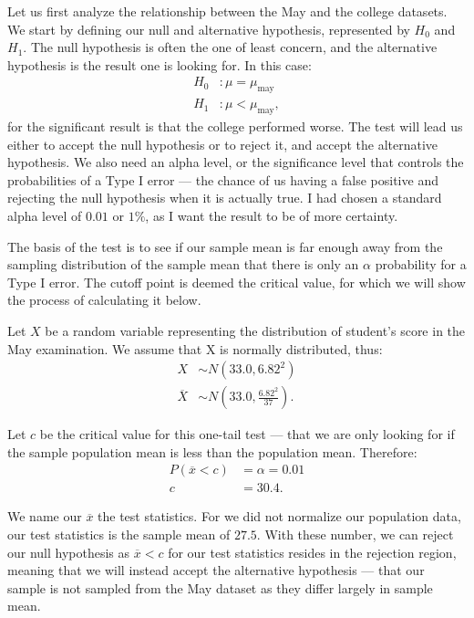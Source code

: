 \documentclass[a4paper,12pt]{tufte-handout}
\begin{document}
Let us first analyze the relationship between the May and the college datasets. We start by defining our null and alternative hypothesis, represented by $H_0$ and $H_1$. The null hypothesis is often the one of least concern, and the alternative hypothesis is the result one is looking for. In this case:
\begin{align*}
    H_0 &: \mu = \mu_{\text{may}}\\
    H_1 &: \mu < \mu_{\text{may}},
\end{align*}
for the significant result is that the college performed worse. The test will lead us either to accept the null hypothesis or to reject it, and accept the alternative hypothesis. We also need an alpha level, or the significance level that controls the probabilities of a Type I error --- the chance of us having a false positive and rejecting the null hypothesis when it is actually true. I had chosen a standard alpha level of $0.01$ or $1\%$, as I want the result to be of more certainty.

The basis of the test is to see if our sample mean is far enough away from the sampling distribution of the sample mean that there is only an $\alpha$ probability for a Type I error. The cutoff point is deemed the critical value, for which we will show the process of calculating it below.

Let $X$ be a random variable representing the distribution of student's score in the May examination. We assume that X is normally distributed, thus:
\begin{align*}
    X &\sim N(33.0, 6.82^2)\\
    \overline{X} &\sim N(33.0, \frac{6.82^2}{37}).
\end{align*}

Let $c$ be the critical value for this one-tail test --- that we are only looking for if the sample population mean is less than the population mean. Therefore:
\begin{align*}
    P(\overline{x} < c) &= \alpha = 0.01\\
    c &= 30.4.
\end{align*}

We name our $\overline{x}$ the test statistics. For we did not normalize our population data, our test statistics is the sample mean of $27.5$. With these number, we can reject our null hypothesis as $\overline{x} < c$ for our test statistics resides in the rejection region, meaning that we will instead accept the alternative hypothesis --- that our sample is not sampled from the May dataset as they differ largely in sample mean.
\end{document}
